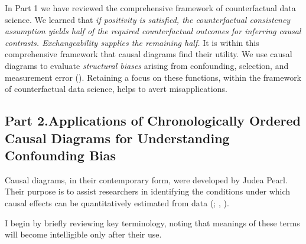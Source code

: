 \documentclass[
  singlecolumn,
  9pt]{article}
\begin{document}
In Part 1 we have reviewed the comprehensive framework of counterfactual
data science. We learned that \emph{if positivity is satisfied, the
counterfactual consistency assumption yields half of the required
counterfactual outcomes for inferring causal contrasts. Exchangeability
supplies the remaining half.} It is within this comprehensive framework
that causal diagrams find their utility. We use causal diagrams to
evaluate \emph{structural biases} arising from confounding, selection,
and measurement error (). Retaining a focus on these functions, within the framework of
counterfactual data science, helps to avert misapplications.

\subsection{Part 2.Applications of Chronologically Ordered Causal
Diagrams for Understanding Confounding
Bias}\label{part-2.applications-of-chronologically-ordered-causal-diagrams-for-understanding-confounding-bias}

Causal diagrams, in their contemporary form, were developed by Judea
Pearl. Their purpose is to assist researchers in identifying the
conditions under which causal effects can be quantitatively estimated
from data (;
, ).

I begin by briefly reviewing key terminology, noting that meanings of
these terms will become intelligible only after their use.
\end{document}
